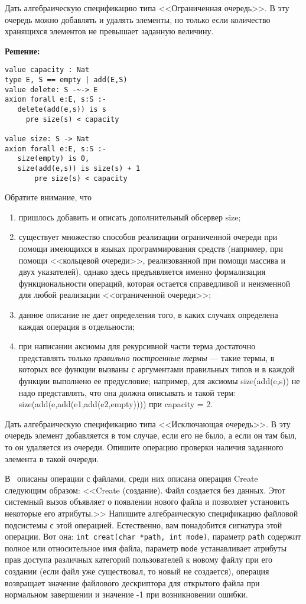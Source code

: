\z Дать алгебраическую спецификацию типа <<Ограниченная очередь>>. В эту очередь можно добавлять и удалять элементы, но только если количество хранящихся элементов не превышает заданную величину.

\textbf{Решение:}
\begin{lstlisting}
value capacity : Nat
type E, S == empty | add(E,S)
value delete: S -~-> E
axiom forall e:E, s:S :-
   delete(add(e,s)) is s
     pre size(s) < capacity

value size: S -> Nat
axiom forall e:E, s:S :-
   size(empty) is 0,
   size(add(e,s)) is size(s) + 1
       pre size(s) < capacity
\end{lstlisting}

Обратите внимание, что
\begin{enumerate}
\item пришлось добавить и описать дополнительный обсервер size;
\item существует множество способов реализации ограниченной очереди при помощи имеющихся в языках программирования средств (например, при помощи <<кольцевой очереди>>, реализованной при помощи массива и двух указателей), однако здесь предъявляется именно формализация функциональности операций, которая остается справедливой и неизменной для любой реализации <<ограниченной очереди>>;
\item данное описание не дает определения того, в каких случаях определена каждая операция в отдельности;
\item при написании аксиомы для рекурсивной части терма достаточно представлять только \emph{правильно построенные термы} --- такие термы, в которых все функции вызваны с аргументами правильных типов и в каждой функции выполнено ее предусловие; например, для аксиомы size(add(e,s)) не надо представлять, что она должна описывать и такой терм: size(add(e,add(e1,add(e2,empty)))) при capacity = 2.
\end{enumerate}

\z Дать алгебраическую спецификацию типа <<Исключающая очередь>>. В эту очередь элемент добавляется в том случае, если его не было, а если он там был, то он удаляется из очереди. Опишите операцию проверки наличия заданного элемента в такой очереди.



\z В~\cite{tanenbaum_os} описаны операции с файлами, среди них описана операция Create следующим образом: <<\textsf{Create} (создание). Файл создается без данных. Этот системный вызов объявляет о появлении нового файла и позволяет установить некоторые его атрибуты.>> Напишите алгебраическую спецификацию файловой подсистемы с этой операцией. Естественно, вам понадобится сигнатура этой операции. Вот она:  \texttt{int creat(char *path, int mode)}, параметр \texttt{path} содержит полное или относительное имя файла, параметр \texttt{mode} устанавливает атрибуты прав доступа различных категорий пользователей к новому файлу при его создании (если файл уже существовал, то новый не создается), операция возвращает значение файлового дескриптора для открытого файла при нормальном завершении и значение -1 при возникновении ошибки.

